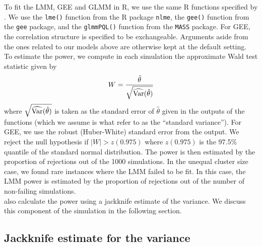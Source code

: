 \documentclass[10pt]{article}
\begin{document}
To fit the LMM, GEE and GLMM in R, we use the same R functions specified by \textcite{Hussey:2007}. We use the \verb|lme()| function from the R package \verb|nlme|, the \verb|gee()| function from the \verb|gee| package, and the \verb|glmmPQL()| function from the \verb|MASS| package. For GEE, the correlation structure is specified to be exchangeable. Arguments aside from the ones related to our models above are otherwise kept at the default setting.
\\

To estimate the power, we compute in each simulation the approximate Wald test statistic given by
\[
W=\frac{\hat{\theta}}{\sqrt{\widehat{\mathrm{Var}}(\hat{\theta})}}
\]
where $\sqrt{\widehat{\mathrm{Var}}(\hat{\theta})}$ is taken as the standard error of $\hat{\theta}$ given in the outputs of the functions (which we assume is what \citeauthor{Hussey:2007} refer to as the ``standard variance''). For GEE, we use the robust (Huber-White) standard error from the output. We reject the null hypothesis if $|W|>z(0.975)$ where $z(0.975)$ is the 97.5\% quantile of the standard normal distribution. The power is then estimated by the proportion of rejections out of the 1000 simulations. In the unequal cluster size case, we found rare instances where the LMM failed to be fit. In this case, the LMM power is estimated by the proportion of rejections out of the number of non-failing simulations.
\\

\citeauthor{Hussey:2007} also calculate the power using a jackknife estimate of the variance. We discuss this component of the simulation in the following section.

\subsection{Jackknife estimate for the variance} \label{sec:jackknife}
\end{document}

